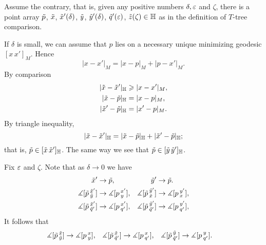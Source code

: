 Assume the contrary, that is, given any positive numbers $\delta,\eps$ and $\zeta$, there is a point array $\~p$, $\~x$, $\~x'(\delta)$, $\~y$, $\~y'(\delta)$, $\~q'(\eps)$, $\~z(\zeta)\in\HH$ as in the definition of $T$-tree comparison.

\begin{wrapfigure}{r}{35 mm}
\end{wrapfigure}

If $\delta$ is small, we can assume that $p$ lies on a necessary unique minimizing geodesic $[x\,x']_M$.
Hence 
\[|x-x'|_M=|x-p|_M+|p-x'|_M.\]
By comparison
\begin{align*}
|\~x-\~x'|_\HH&\ge|x-x'|_M,
\\
|\~x-\~p|_\HH&=|x-p|_M,
\\
|\~x'-\~p|_\HH&=|x'-p|_M.
\end{align*}
By triangle inequality,
\[|\~x-\~x'|_\HH=|\~x-\~p|_\HH+|\~x'-\~p|_\HH;\]
that is, $\~p\in [\~x\,\~x']_\HH$.
The same way we see that $\~p\in [\~y\,\~y']_\HH$.

Fix $\eps$ and $\zeta$.
Note that as $\delta\to 0$ we have 
\begin{align*}
\~x'&\to \~p,
&
\~y'&\to \~p.
\\
\measuredangle[\~p\,^{\~x'}_{\~y}]&\to \measuredangle[p\,^{x'}_{y}],
&
\measuredangle[\~p\,^{\~y'}_{\~x}]&\to \measuredangle[p\,^{y'}_{x}],
\\
\measuredangle[\~p\,^{\~x'}_{\~q'}]&\to \measuredangle[p\,^{x'}_{q'}],
&
\measuredangle[\~p\,^{\~y'}_{\~q'}]&\to \measuredangle[p\,^{y'}_{q'}],
\end{align*}
It follows that 
\begin{align*}
\measuredangle[\~p\,^{\~x}_{\~y}]&\to \measuredangle[p\,^x_y],
&
\measuredangle[\~p\,^{\~x}_{\~q'}]&\to \measuredangle[p\,^x_{q'}],
&
\measuredangle[\~p\,^{\~y}_{\~q'}]&\to \measuredangle[p\,^y_{q'}].
\end{align*}


